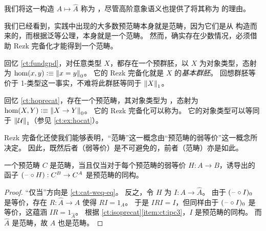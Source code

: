 我们将这一构造 $A\mapsto \widehat A$ 称为 ，尽管高阶意象语义也提供了将其称为  的理由。
%
%
%

我们已经看到，实践中出现的大多数预范畴本身就是范畴，因为它们是从 \uset 构造而来的，而根据泛等公理，\uset 本身就是一个范畴。
然而，确实存在少数情况，必须借助 Rezk 完备化才能得到一个范畴。

\begin{eg}\label{ct:rezk-fundgpd-trunc1}
  回忆 \cref{ct:fundgpd}，对任意类型 $X$，都存在一个预群胚，以 $X$ 为对象类型，态射为 $\hom(x,y) \defeq \pizero{x=y}$。
  它的 Rezk 完备化就是 $X$ 的\emph{基本群胚}。
  回想群胚等价于 1-类型这一事实，不难将此群胚等同于 $\trunc1X$。
\end{eg}

\begin{eg}\label{ct:hocat}
  回忆 \cref{ct:hoprecat}，存在一个预范畴，其对象类型为 \type，态射为 $\hom(X,Y) \defeq \pizero{X\to Y}$。
  它的 Rezk 完备化可以称为。
  它的对象类型可以等同于 $\trunc1\type$（参见 \cref{ct:ex:hocat}）。
\end{eg}

Rezk 完备化还使我们能够表明，``范畴''这一概念由``预范畴的弱等价''这一概念所决定。
因此，既然后者（弱等价）是不可避免的，前者（范畴）亦是如此。

\begin{thm}\label{ct:weq-iso-precat-cat}
  一个预范畴 $C$ 是范畴，当且仅当对于每个预范畴的弱等价 $H:A\to B$，诱导出的函子 $(\blank\circ H):C^B \to C^A$ 是预范畴的同构。
\end{thm}

\begin{proof}
  ``仅当''方向是 \cref{ct:cat-weq-eq}。
  反之，令 $H$ 为 $I:A\to\widehat A$。
  由于 $(\blank\circ I)_0$ 是等价，存在 $R:\widehat A\to A$ 使得 $RI=1_A$。
  于是 $IRI=I$，但同样由于 $(\blank\circ I)_0$ 是等价，这蕴涵 $IR =1_{\widehat A}$。
  根据 \cref{ct:isoprecat}\ref{item:ct:ipc3}，$I$ 是预范畴的同构。
  而 $\widehat A$ 是范畴，故 $A$ 也是范畴。
\end{proof}

%

\newpage


